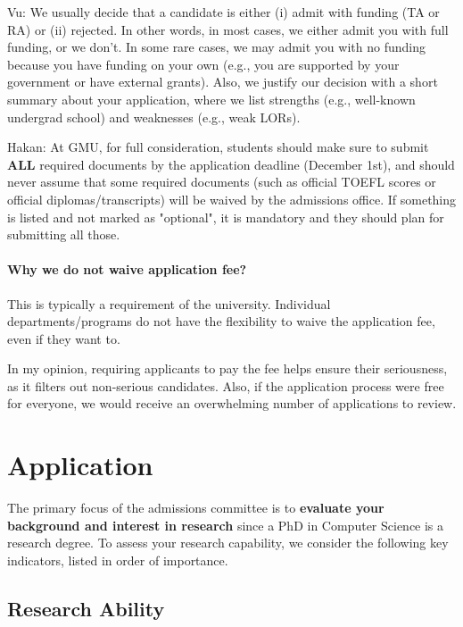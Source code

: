 \documentclass[10pt]{article}
\begin{document}
\begin{tcolorbox}[left=1pt,right=1pt,top=1pt,bottom=1pt]
Vu: We usually decide that a candidate is either (i) admit with funding (TA or RA) or (ii) rejected. In other words, in most cases, we either
admit you with full funding, or we don't. In some rare cases, we may admit
you with no funding because you have funding on your own (e.g., you are
supported by your government or have external grants). Also, we justify
our decision with a short summary about your application, where we list
strengths (e.g., well-known undergrad school) and weaknesses (e.g., weak
LORs).
\end{tcolorbox}

\begin{tcolorbox}[left=1pt,right=1pt,top=1pt,bottom=1pt]
    Hakan: At GMU, for full consideration, students should make sure to submit \textbf{ALL} required documents by the application deadline (December 1st), and should never assume that some required documents (such as official TOEFL scores or official diplomas/transcripts) will be waived by the admissions office. If something is listed and not marked as "optional", it is mandatory and they should plan for submitting all those.  
\end{tcolorbox}
\paragraph{Why we do not waive application fee?}  This is typically a requirement of the university. Individual departments/programs do not have the flexibility to waive the application fee, even if they want to. 

In my opinion, requiring applicants to pay the fee helps ensure their seriousness, as it filters out non-serious candidates. Also, if the application process were free for everyone, we would receive an overwhelming number of applications to review.


\section{Application}\label{sec:application}

The primary focus of the admissions committee is to \textbf{evaluate your background and interest in research} since a PhD in Computer Science
is a research degree. To assess your research capability, we consider
the following key indicators, listed in order of importance.

\subsection{Research Ability}
\end{document}
